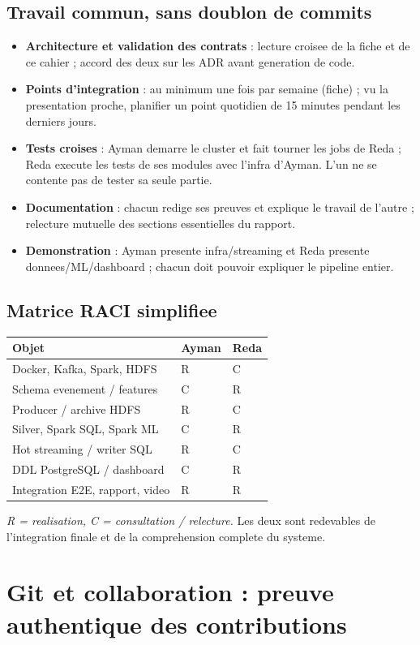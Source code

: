 \documentclass[10pt,a4paper]{article}
\begin{document}
\subsection{Travail commun, sans doublon de commits}
\begin{itemize}
\item \textbf{Architecture et validation des contrats} : lecture croisee de la fiche et de ce cahier ; accord des deux sur les ADR avant generation de code.
\item \textbf{Points d'integration} : au minimum une fois par semaine (fiche) ; vu la presentation proche, planifier un point quotidien de 15 minutes pendant les derniers jours.
\item \textbf{Tests croises} : Ayman demarre le cluster et fait tourner les jobs de Reda ; Reda execute les tests de ses modules avec l'infra d'Ayman. L'un ne se contente pas de tester sa seule partie.
\item \textbf{Documentation} : chacun redige ses preuves et explique le travail de l'autre ; relecture mutuelle des sections essentielles du rapport.
\item \textbf{Demonstration} : Ayman presente infra/streaming et Reda presente donnees/ML/dashboard ; chacun doit pouvoir expliquer le pipeline entier.
\end{itemize}

\subsection{Matrice RACI simplifiee}
\begin{tabularx}{\linewidth}{@{}Yp{19mm}p{19mm}@{}}
\toprule
\textbf{Objet} & \textbf{Ayman} & \textbf{Reda}\\\midrule
Docker, Kafka, Spark, HDFS & R & C\\
Schema evenement / features & C & R\\
Producer / archive HDFS & R & C\\
Silver, Spark SQL, Spark ML & C & R\\
Hot streaming / writer SQL & R & C\\
DDL PostgreSQL / dashboard & C & R\\
Integration E2E, rapport, video & R & R\\
\bottomrule
\end{tabularx}
\emph{R = realisation, C = consultation / relecture.} Les deux sont redevables de l'integration finale et de la comprehension complete du systeme.

\section{Git et collaboration : preuve authentique des contributions}
\end{document}
